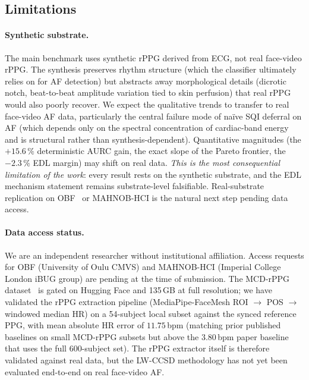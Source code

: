 \documentclass[journal]{IEEEtran}
\begin{document}
\subsection{Limitations}
\paragraph{Synthetic substrate.} The main benchmark uses synthetic rPPG derived from ECG, not real face-video rPPG. The synthesis preserves rhythm structure (which the classifier ultimately relies on for AF detection) but abstracts away morphological details (dicrotic notch, beat-to-beat amplitude variation tied to skin perfusion) that real rPPG would also poorly recover. We expect the qualitative trends to transfer to real face-video AF data, particularly the central failure mode of na\"{i}ve SQI deferral on AF (which depends only on the spectral concentration of cardiac-band energy and is structural rather than synthesis-dependent). Quantitative magnitudes (the $+15.6\,\%$ deterministic AURC gain, the exact slope of the Pareto frontier, the $-2.3\,\%$ EDL margin) may shift on real data. \emph{This is the most consequential limitation of the work}: every result rests on the synthetic substrate, and the EDL mechanism statement remains substrate-level falsifiable. Real-substrate replication on OBF~\cite{li2018obf} or MAHNOB-HCI is the natural next step pending data access.

\paragraph{Data access status.} We are an independent researcher without institutional affiliation. Access requests for OBF (University of Oulu CMVS) and MAHNOB-HCI (Imperial College London iBUG group) are pending at the time of submission. The MCD-rPPG dataset~\cite{moody2001mitbih} is gated on Hugging Face and 135\,GB at full resolution; we have validated the rPPG extraction pipeline (MediaPipe-FaceMesh ROI $\to$ POS $\to$ windowed median HR) on a 54-subject local subset against the synced reference PPG, with mean absolute HR error of $11.75$\,bpm (matching prior published baselines on small MCD-rPPG subsets but above the $3.80$\,bpm paper baseline that uses the full 600-subject set). The rPPG extractor itself is therefore validated against real data, but the LW-CCSD methodology has not yet been evaluated end-to-end on real face-video AF.
\end{document}

